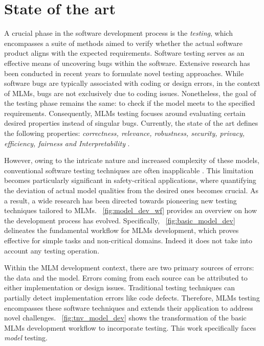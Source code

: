 \section{State of the art}

A crucial phase in the software development process is the \textit{testing}, which encompasses a suite of methods aimed to verify whether the actual software product aligns with the expected requirements. Software testing serves as an effective means of uncovering bugs within the software. Extensive research has been conducted in recent years to formulate novel testing approaches. While software bugs are typically associated with coding or design errors, in the context of MLMs, bugs are not exclusively due to coding issues. Nonetheless, the goal of the testing phase remains the same: to check if the model meets to the specified requirements. Consequently, MLMs testing focuses around evaluating certain desired properties instead of singular bugs. Currently, the state of the art defines the following properties: \textit{correctness, relevance, robustness, security, privacy, efficiency, fairness and Interpretability} \cite{zhang2019machine}.

However, owing to the intricate nature and increased complexity of these models, conventional software testing techniques are often inapplicable \cite{VVinef}. This limitation becomes particularly significant in safety-critical applications, where quantifying the deviation of actual model qualities from the desired ones becomes crucial. As a result, a wide research has been directed towards pioneering new testing techniques tailored to MLMs. \Fig~\ref{fig:model_dev_wf} provides an overview on how the development process has evolved. Specifically, \Fig~\ref{fig:basic_model_dev} delineates the fundamental workflow for MLMs development, which proves effective for simple tasks and non-critical domains. Indeed it does not take into account any testing operation.

Within the MLM development context, there are two primary sources of errors: the data and the model. Errors coming from each source can be attributed to either implementation or design issues. Traditional testing techniques can partially detect implementation errors like code defects. Therefore, MLMs testing encompasses these software techniques and extends their application to address novel challenges. \Fig~\ref{fig:tnv_model_dev} shows the transformation of the basic MLMs development workflow to incorporate testing. This work specifically faces \textit{model} testing.

